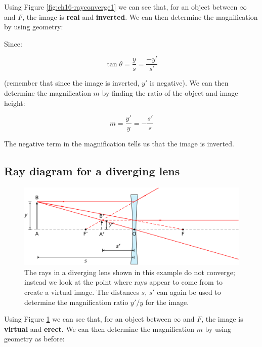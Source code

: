 \documentclass[
]{book}
\begin{document}
Using Figure \ref{fig:ch16-rayconverge1} we can see that, for an object between \(\infty\) and \(F\), the image is \textbf{real} and \textbf{inverted}. We can then determine the magnification by using geometry:

Since:

\begin{equation}
\tan \theta = \frac{y}{s} = \frac{-y'}{s'}
\end{equation}

(remember that since the image is inverted, \(y'\) is negative). We can then determine the magnification \(m\) by finding the ratio of the object and image height:

\begin{equation}
m = \frac{y'}{y} = -\frac{s'}{s}
\end{equation}

The negative term in the magnification tells us that the image is inverted.

\hypertarget{sec-ch16-raydiverge1}{%
\subsection{Ray diagram for a diverging lens}\label{sec-ch16-raydiverge1}}

\begin{figure}

{\centering \includegraphics[width=0.7\linewidth]{visualisations/LaTeX/ch16-diverginglens2a} 

}

\caption{The rays in a diverging lens shown in this example do not converge; instead we look at the point where rays appear to come from to create a virtual image. The distances $s$, $s'$ can again be used to determine the magnification ratio $y'/y$ for the image.}\label{fig:ch16-raydiverge1}
\end{figure}

Using Figure \ref{fig:ch16-raydiverge1} we can see that, for an object between \(\infty\) and \(F\), the image is \textbf{virtual} and \textbf{erect}. We can then determine the magnification \(m\) by using geometry as before:
\end{document}

